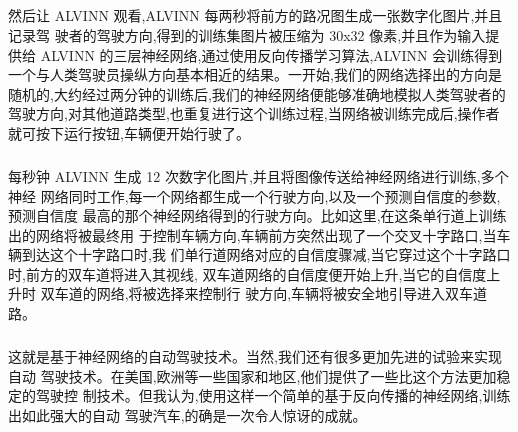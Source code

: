\documentclass{article}
\begin{document}
\begin{CJK}{UTF8}{gbsn}
\begin{figure}[H]
\label{fig:5556}
\end{figure}
\subparagraph{}
然后让 ALVINN 观看,ALVINN 每两秒将前方的路况图生成一张数字化图片,并且记录驾
驶者的驾驶方向,得到的训练集图片被压缩为 30x32 像素,并且作为输入提供给 ALVINN 的三层神经网络,通过使用反向传播学习算法,ALVINN 会训练得到一个与人类驾驶员操纵方向基本相近的结果。一开始,我们的网络选择出的方向是随机的,大约经过两分钟的训练后,我们的神经网络便能够准确地模拟人类驾驶者的驾驶方向,对其他道路类型,也重复进行这个训练过程,当网络被训练完成后,操作者就可按下运行按钮,车辆便开始行驶了。
\begin{figure}[H]
\label{fig:5558}
\end{figure}
\subparagraph{}
每秒钟 ALVINN 生成 12 次数字化图片,并且将图像传送给神经网络进行训练,多个神经
网络同时工作,每一个网络都生成一个行驶方向,以及一个预测自信度的参数,预测自信度
最高的那个神经网络得到的行驶方向。比如这里,在这条单行道上训练出的网络将被最终用
于控制车辆方向,车辆前方突然出现了一个交叉十字路口,当车辆到达这个十字路口时,我
们单行道网络对应的自信度骤减,当它穿过这个十字路口时,前方的双车道将进入其视线,
双车道网络的自信度便开始上升,当它的自信度上升时 双车道的网络,将被选择来控制行
驶方向,车辆将被安全地引导进入双车道路。
\subparagraph{}
这就是基于神经网络的自动驾驶技术。当然,我们还有很多更加先进的试验来实现自动
驾驶技术。在美国,欧洲等一些国家和地区,他们提供了一些比这个方法更加稳定的驾驶控
制技术。但我认为,使用这样一个简单的基于反向传播的神经网络,训练出如此强大的自动
驾驶汽车,的确是一次令人惊讶的成就。
\end{CJK}
\end{document}
